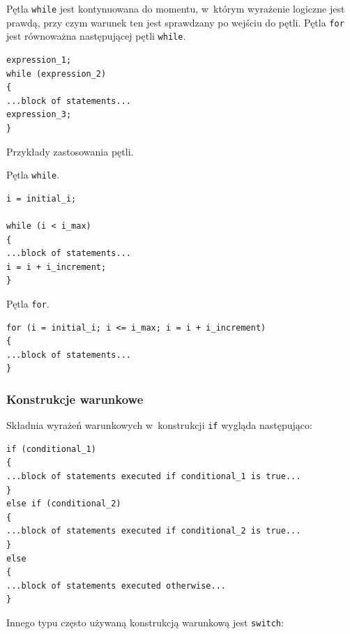 Pętla \lstinline[style=MyCStyle]{while} jest kontynuowana do momentu, w~którym  wyrażenie logiczne jest prawdą, przy czym warunek ten jest sprawdzany po wejściu do pętli. Pętla \lstinline[style=MyCStyle]{for} jest równoważna następującej pętli \lstinline[style=MyCStyle]{while}.

\begin{lstlisting}[style=MyCStyle]
expression_1;
while (expression_2)
{
...block of statements...
expression_3;
}
\end{lstlisting}

Przykłady zastosowania pętli.

\begin{myitemize}
\item Pętla \lstinline[style=MyCStyle]{while}.
\end{myitemize}

\begin{lstlisting}[style=MyCStyle]
i = initial_i;

while (i < i_max)
{
...block of statements...
i = i + i_increment;
}
\end{lstlisting}

\begin{myitemize}
\item Pętla \lstinline[style=MyCStyle]{for}.
\end{myitemize}

\begin{lstlisting}[style=MyCStyle,caption=Pętla for - przykład]
for (i = initial_i; i <= i_max; i = i + i_increment)
{
...block of statements...
}
\end{lstlisting}


\subsubsection{Konstrukcje warunkowe}

Składnia wyrażeń warunkowych w~konstrukcji \lstinline[style=MyCStyle]{if} wygląda następująco: 

\begin{lstlisting}[style=MyCStyle]
if (conditional_1) 
{
...block of statements executed if conditional_1 is true...
}
else if (conditional_2)
{
...block of statements executed if conditional_2 is true...
}
else
{
...block of statements executed otherwise...
}

\end{lstlisting}

Innego typu często używaną konstrukcją warunkową jest \lstinline[style=MyCStyle]{switch}: 

